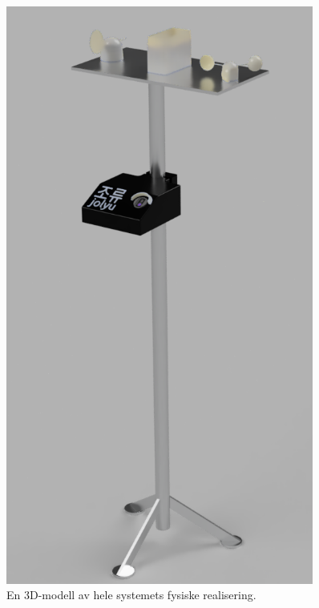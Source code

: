\begin{figure}[H]
\begin{minipage}[c]{0.45\textwidth}
\end{minipage}
\begin{minipage}[c]{0.45\textwidth}
\centering
    \includegraphics[width=0.9\textwidth]{implementering/stativ_render.png}
    \caption{En 3D-modell av hele systemets fysiske realisering.}
    \label{fig:3dsystem}
\end{minipage}
\end{figure}